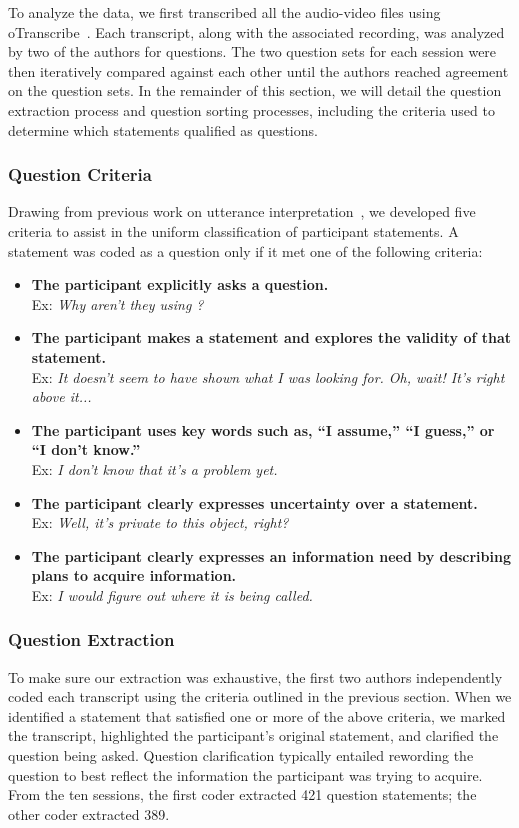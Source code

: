 \documentclass[10pt,journal,compsoc]{IEEEtran}
\newcommand{\compresslist}{
	\vspace{-1em}
	\setlength{\itemsep}{1pt}
	\setlength{\parskip}{0pt}
	\setlength{\parsep}{0pt}
}
\begin{document}
\label{sec:questionAnalysis}
To analyze the data, we first transcribed all the audio-video files using oTranscribe~\cite{OTranscribe}.
Each transcript, along with the associated recording, was analyzed by two of the authors for questions. 
The two question sets for each session were then iteratively compared against each other until the authors reached agreement on the question sets. 
In the remainder of this section, we will detail the question extraction process and question sorting processes, including the criteria used to determine which statements qualified as questions.
\subsubsection{Question Criteria}
Drawing from previous work on utterance interpretation~\cite{letovsky1987cognitive}, we developed five criteria to assist in the uniform classification of participant statements. 
A statement was coded as a question only if it met one of the following criteria:
\\
\begin{itemize}
\compresslist	
\item \textbf{The participant explicitly asks a question.}
\\ Ex: \textit{Why aren't they using ?}
\item \textbf{The participant makes a statement and explores the validity of that statement.}
\\ Ex: \textit{It doesn't seem to have shown what I was looking for. Oh, wait! It's right above it...}
\item \textbf{The participant uses key words such as, ``I assume,'' ``I guess,'' or ``I don't know.''}
\\ Ex: \textit{I don't know that it's a problem yet.}
\item \textbf{The participant clearly expresses uncertainty over a statement.}
\\ Ex: \textit{Well, it's private to this object, right?}
\item \textbf{The participant clearly expresses an information need by describing plans to acquire information.}
\\ Ex: \textit{I would figure out where it is being called.}

\end{itemize}




\subsubsection{Question Extraction}
To make sure our extraction was exhaustive, the first two authors independently coded each transcript using the criteria outlined in the previous section.
When we identified a statement that satisfied one or more of the above criteria, we marked the transcript, highlighted the participant's original statement, and clarified the question being asked.
Question clarification typically entailed rewording the question to best reflect the information the participant was trying to acquire.
From the ten sessions, the first coder extracted 421 question statements; the other coder extracted 389. 
\end{document}
